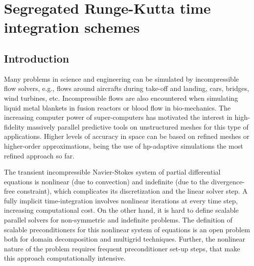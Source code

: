 \chapter{Segregated Runge-Kutta time integration schemes}
\label{chap-SRK}

\section{Introduction}
\label{sec-C6_Intro}

Many problems in science and engineering can be simulated by incompressible flow solvers, e.g., flows around aircrafts during take-off and landing, cars, bridges, wind turbines, etc. Incompressible flows are also encountered when simulating liquid metal blankets in fusion reactors or blood flow in bio-mechanics. The increasing computer power of super-computers has motivated the interest in high-fidelity massively parallel predictive tools on unstructured meshes for this type of applications. Higher levels of accuracy in space can be based on refined meshes or higher-order approximations, being the use of hp-adaptive simulations the most refined approach so far.

The transient incompressible Navier-Stokes system of partial differential equations is nonlinear (due to convection) and indefinite (due to the divergence-free constraint), which complicates its discretization and the linear solver step. A fully implicit time-integration involves nonlinear iterations at every time step, increasing computational cost. On the other hand, it is hard to define scalable parallel solvers for non-symmetric and indefinite problems. The definition of scalable preconditioners for this nonlinear system of equations is an open problem both for domain decomposition and multigrid techniques. 
Further, the nonlinear nature of the problem requires frequent preconditioner set-up steps, that make this approach computationally intensive. 

